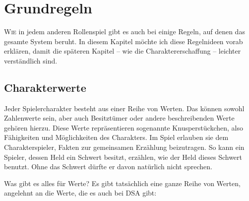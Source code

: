 \BN
\chapter{Grundregeln}\label{Ch:Grundregeln}
\lettrine{W}{ie} in jedem anderen Rollenspiel gibt es auch bei \StoryDSA einige Regeln, auf denen das gesamte System beruht. In diesem Kapitel möchte ich diese Regelnideen vorab erklären, damit die späteren Kapitel -- wie die Charaktererschaffung -- leichter verständlich sind.

\section{Charakterwerte}
Jeder Spielercharakter besteht aus einer Reihe von Werten. Das können sowohl Zahlenwerte sein, aber auch Besitztümer oder andere beschreibenden Werte gehören hierzu. Diese Werte repräsentieren sogenannte Knusperstückchen, also Fähigkeiten und Möglichkeiten des Charakters. Im Spiel erlauben sie dem Charakterspieler, Fakten zur gemeinsamen Erzählung beizutragen. So kann ein Spieler, dessen Held ein Schwert besitzt, erzählen, wie der Held dieses Schwert benutzt. Ohne das Schwert dürfte er davon natürlich nicht sprechen.

Was gibt es alles für Werte? Es gibt tatsächlich eine ganze Reihe von Werten, angelehnt an die Werte, die es auch bei DSA gibt:

